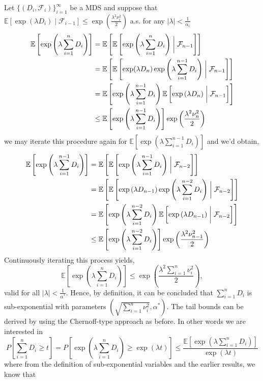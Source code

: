 \documentclass[10pt,handout,english]{beamer}
\newcommand{\E}{\mathbb{E}}
\newcommand{\F}{\mathcal{F}}
\newcommand{\1}{\mathbbm{1}}
\begin{document}
\begin{frame}[allowframebreaks]
Let $\{(D_i,\F_i)\}_{i=1}^{\infty}$ be a MDS and suppose that $\E[\exp(\lambda D_i)\mid\F_{i-1}]\leq\exp\left(\frac{\lambda^2\nu^2_i}{2}\right)$ a.s. for any $\lvert\lambda\rvert<\frac{1}{\alpha_i}$
\begingroup
\allowdisplaybreaks
\begin{align*}
\E\left[\exp\left(\lambda\sum_{i=1}^n D_i\right)\right]&=\E\left[\E\left[\exp\left(\lambda\sum_{i=1}^n D_i\right)\biggm\vert\F_{n-1}\right]\right]\\
&=\E\left[\E\left[\exp(\lambda D_n)\exp\left(\lambda\sum_{i=1}^{n-1} D_i\right)\biggm\vert\F_{n-1}\right]\right]\\
&=\E\left[\exp\left(\lambda\sum_{i=1}^{n-1} D_i\right)\E\left[\exp\left(\lambda D_n\right)\biggm\vert\F_{n-1}\right]\right]\\
&\leq\E\left[\exp\left(\lambda\sum_{i=1}^{n-1} D_i\right)\right]\exp\left(\frac{\lambda^2\nu^2_n}{2}\right)
\end{align*} 
\endgroup
we may iterate this procedure again for $\E[\exp(\lambda\sum_{i=1}^{n-1} D_i)]$ and we'd obtain,
\begingroup
\allowdisplaybreaks
\begin{align*}
\E\left[\exp\left(\lambda\sum_{i=1}^{n-1} D_i\right)\right]&=\E\left[\E\left[\exp\left(\lambda\sum_{i=1}^{n-1} D_i\right)\biggm\vert\F_{n-2}\right]\right]\\
&=\E\left[\E\left[\exp\left(\lambda D_{n-1}\right)\exp\left(\lambda\sum_{i=1}^{n-2} D_i\right)\biggm\vert\F_{n-2}\right]\right]\\
&=\E\left[\exp\left(\lambda\sum_{i=1}^{n-2} D_i\right)\E\left[\exp\left(\lambda D_{n-1}\right)\biggm\vert\F_{n-2}\right]\right]\\
&\leq\E\left[\exp\left(\lambda\sum_{i=1}^{n-2} D_i\right)\right]\exp\left(\frac{\lambda^2\nu^2_{n-1}}{2}\right)
\end{align*} 
\endgroup
Continuously iterating this process yields,
\[
\E\left[\exp\left(\lambda\sum_{i=1}^n D_i\right)\right]\leq\exp\left(\frac{\lambda^2\sum_{i=1}^{n}\nu_i^2}{2}\right), 
\]
valid for all $\lvert\lambda\rvert< \frac{1}{\alpha^*}$. Hence, by definition, it can be concluded that $\sum_{i=1}^nD_i$ is sub-exponential with parameters $(\sqrt{\sum_{i=1}^n\nu_i^2},\alpha^*)$.  The tail bounds can be derived by using the Chernoff-type approach as before. In other words we are interested in
\[
P\left[\sum\limits_{i=1}^n D_i\geq t\right]=P\left[\exp\left(\lambda\sum\limits_{i=1}^{n} D_i\right)\geq \exp\left(\lambda t\right)\right]\leq\frac{\E\left[\exp\left(\lambda\sum\limits_{i=1}^{n} D_i\right)\right]}{\exp(\lambda t)}
\]
where from the definition of sub-exponential variables and the earlier results, we know that

\end{frame}
\end{document}
